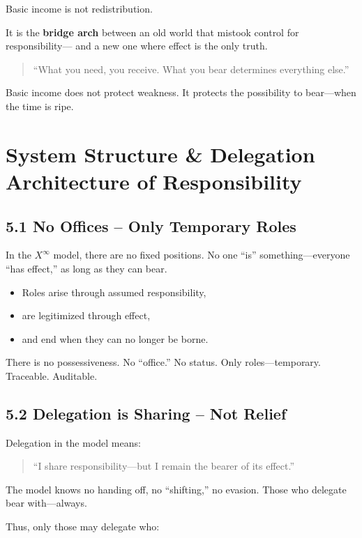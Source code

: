 \documentclass[12pt,a4paper]{book}
\begin{document}
Basic income is not redistribution.

It is the \textbf{bridge arch} between an old world  
that mistook control for responsibility—  
and a new one where effect is the only truth.

\begin{quote}
“What you need, you receive.  
What you bear determines everything else.”  
\end{quote}

Basic income does not protect weakness.  
It protects the possibility to bear—when the time is ripe.

\chapter{System Structure \& Delegation\\Architecture of Responsibility}

\section*{5.1 No Offices – Only Temporary Roles}

In the $X^\infty$ model, there are no fixed positions.  
No one “is” something—everyone “has effect,” as long as they can bear.

\begin{itemize}
    \item Roles arise through assumed responsibility,
    \item are legitimized through effect,
    \item and end when they can no longer be borne.
\end{itemize}

There is no possessiveness. No “office.” No status.  
Only roles—temporary. Traceable. Auditable.

\section*{5.2 Delegation is Sharing – Not Relief}

Delegation in the model means:

\begin{quote}
“I share responsibility—but I remain the bearer of its effect.”  
\end{quote}

The model knows no handing off, no “shifting,” no evasion.  
Those who delegate bear with—always.

Thus, only those may delegate who:
\end{document}
